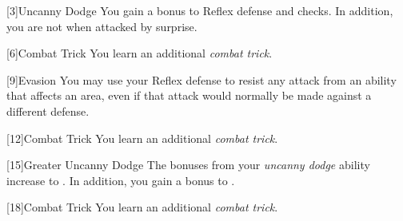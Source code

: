         [3]{Uncanny Dodge} You gain a  bonus to Reflex defense and  checks.
        In addition, you are not \unaware when attacked by surprise.

        [6]{Combat Trick}
        You learn an additional \textit{combat trick}.

        [9]{Evasion}
        You may use your Reflex defense to resist any attack from an ability that affects an area, even if that attack would normally be made against a different defense.

        [12]{Combat Trick}
        You learn an additional \textit{combat trick}.

        [15]{Greater Uncanny Dodge}
        The bonuses from your \textit{uncanny dodge} ability increase to .
        In addition, you gain a  bonus to .

        [18]{Combat Trick}
        You learn an additional \textit{combat trick}.

\newpage
